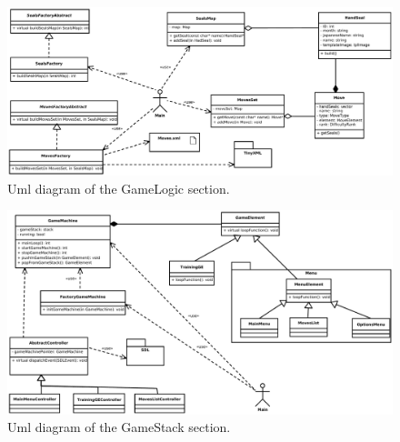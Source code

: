 \documentclass[a4paper,10pt, twocolumn]{article}
\begin{document}
\begin{figure}[tp]
  \centering
    \includegraphics[scale=0.45]{UmlDiagrams/gameLogic.pdf}
    \caption{Uml diagram of the GameLogic section.}
  \label{gameLogicDiagram}       
  \end{figure}
  
  \begin{figure}[bp]
  \centering
    \includegraphics[scale=0.4]{UmlDiagrams/gameStack.pdf}
    \caption{Uml diagram of the GameStack section.}
  \label{gameStackDiagram}       
  \end{figure}
\end{document}
